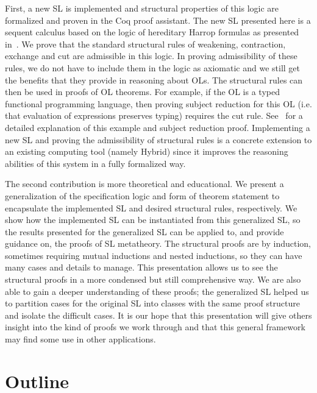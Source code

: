 First, a new SL is implemented and structural properties of this logic are formalized and proven in the Coq proof assistant. The new SL presented here is a sequent calculus based on the logic of hereditary Harrop formulas as presented in~\cite{LProlog}. We prove that the standard structural rules of weakening, contraction, exchange and cut are admissible in this logic. In proving admissibility of these rules, we do not have to include them in the logic as axiomatic and we still get the benefits that they provide in reasoning about OLs. The structural rules can then be used in proofs of OL theorems. For example, if the OL is a typed functional programming language, then proving subject reduction for this OL (i.e. that evaluation of expressions preserves typing) requires the cut rule. See~\cite{FeltyMomigliano:JAR10} for a detailed explanation of this example and subject reduction proof. Implementing a new SL and proving the admissibility of structural rules is a concrete extension to an existing computing tool (namely Hybrid) since it improves the reasoning abilities of this system in a fully formalized way.

The second contribution is more theoretical and educational. We present a generalization of the specification logic and form of theorem statement to encapsulate the implemented SL and desired structural rules, respectively. We show how the implemented SL can be instantiated from this generalized SL, so the results presented for the generalized SL can be applied to, and provide guidance on, the proofs of SL metatheory. The structural proofs are by induction, sometimes requiring mutual inductions and nested inductions, so they can have many cases and details to manage. This presentation allows us to see the structural proofs in a more condensed but still comprehensive way. We are also able to gain a deeper understanding of these proofs; the generalized SL helped us to partition cases for the original SL into classes with the same proof structure and isolate the difficult cases. It is our hope that this presentation will give others insight into the kind of proofs we work through and that this general framework may find some use in other applications.

\section{Outline}

